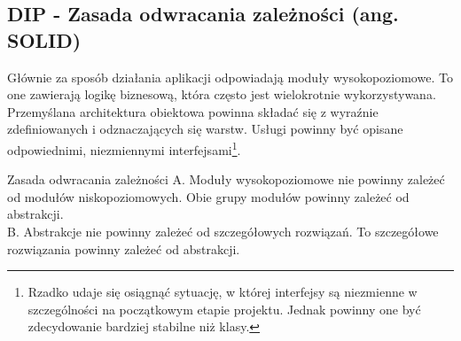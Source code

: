 %
%


\subsection{DIP - Zasada odwracania zależności (ang. SOLI\textbf{D})}

Głównie za sposób działania aplikacji odpowiadają moduły wysokopoziomowe. To one zawierają logikę biznesową, która często jest wielokrotnie wykorzystywana. Przemyślana architektura obiektowa powinna składać się z wyraźnie zdefiniowanych i odznaczających się warstw. Usługi powinny być opisane odpowiednimi, niezmiennymi interfejsami\footnote{Rzadko udaje się osiągnąć sytuację, w której interfejsy są niezmienne w szczególności na początkowym etapie projektu. Jednak powinny one być zdecydowanie bardziej stabilne niż klasy.}.

\begin{myboxWithTitle}{Zasada odwracania zależności}
	A. Moduły wysokopoziomowe nie powinny zależeć od modułów niskopoziomowych. Obie grupy modułów powinny zależeć od abstrakcji.\\
	B. Abstrakcje nie powinny zależeć od szczegółowych rozwiązań. To szczegółowe rozwiązania powinny zależeć od abstrakcji.
\end{myboxWithTitle}

